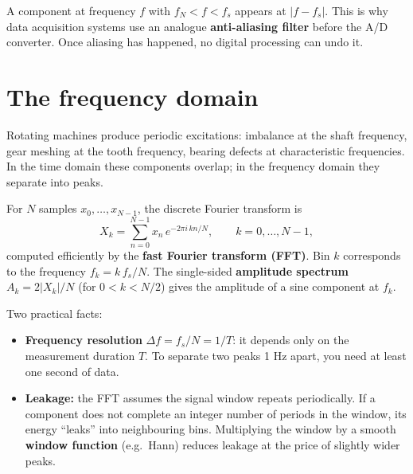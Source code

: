 \documentclass[
  letterpaper,
  DIV=11,
  numbers=noendperiod]{scrreprt}
\providecommand{\tightlist}{%
  \setlength{\itemsep}{0pt}\setlength{\parskip}{0pt}}\usepackage{longtable,booktabs,array}
\begin{document}
A component at frequency \(f\) with \(f_N < f < f_s\) appears at
\(|f - f_s|\). This is why data acquisition systems use an analogue
\textbf{anti-aliasing filter} before the A/D converter. Once aliasing
has happened, no digital processing can undo it.

\section{The frequency domain}\label{the-frequency-domain}

Rotating machines produce periodic excitations: imbalance at the shaft
frequency, gear meshing at the tooth frequency, bearing defects at
characteristic frequencies. In the time domain these components overlap;
in the frequency domain they separate into peaks.

\begin{tcolorbox}[enhanced jigsaw, left=2mm, title=\textcolor{quarto-callout-note-color}{\faInfo}\hspace{0.5em}{Definition: Discrete Fourier transform and amplitude spectrum}, opacityback=0, breakable, rightrule=.15mm, arc=.35mm, toptitle=1mm, colbacktitle=quarto-callout-note-color!10!white, opacitybacktitle=0.6, coltitle=black, colframe=quarto-callout-note-color-frame, bottomrule=.15mm, leftrule=.75mm, bottomtitle=1mm, titlerule=0mm, toprule=.15mm, colback=white]

For \(N\) samples \(x_0, \dots, x_{N-1}\), the discrete Fourier
transform is
\[X_k = \sum_{n=0}^{N-1} x_n\, e^{-2\pi i\,kn/N}, \qquad k = 0, \dots, N-1,\]
computed efficiently by the \textbf{fast Fourier transform (FFT)}. Bin
\(k\) corresponds to the frequency \(f_k = k\,f_s/N\). The single-sided
\textbf{amplitude spectrum} \(A_k = 2|X_k|/N\) (for \(0 < k < N/2\))
gives the amplitude of a sine component at \(f_k\).

\end{tcolorbox}

Two practical facts:

\begin{itemize}
\tightlist
\item
  \textbf{Frequency resolution} \(\Delta f = f_s/N = 1/T\): it depends
  only on the measurement duration \(T\). To separate two peaks 1 Hz
  apart, you need at least one second of data.
\item
  \textbf{Leakage:} the FFT assumes the signal window repeats
  periodically. If a component does not complete an integer number of
  periods in the window, its energy ``leaks'' into neighbouring bins.
  Multiplying the window by a smooth \textbf{window function}
  (e.g.~Hann) reduces leakage at the price of slightly wider peaks.
\end{itemize}
\end{document}
